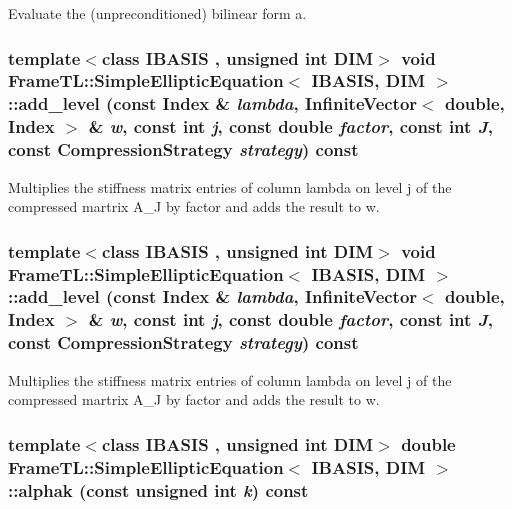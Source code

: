 Evaluate the (unpreconditioned) bilinear form a. \hypertarget{classFrameTL_1_1SimpleEllipticEquation_c21526eb37390ef77b7130e20c6ae000}{
\subsubsection[{add\_\-level}]{\setlength{\rightskip}{0pt plus 5cm}template$<$class IBASIS , unsigned int DIM$>$ void {\bf FrameTL::SimpleEllipticEquation}$<$ IBASIS, DIM $>$::add\_\-level (const {\bf Index} \& {\em lambda}, \/  InfiniteVector$<$ double, {\bf Index} $>$ \& {\em w}, \/  const int {\em j}, \/  const double {\em factor}, \/  const int {\em J}, \/  const CompressionStrategy {\em strategy}) const}}
\label{classFrameTL_1_1SimpleEllipticEquation_c21526eb37390ef77b7130e20c6ae000}


Multiplies the stiffness matrix entries of column lambda on level j of the compressed martrix A\_\-J by factor and adds the result to w. \hypertarget{classFrameTL_1_1SimpleEllipticEquation_c21526eb37390ef77b7130e20c6ae000}{
\subsubsection[{add\_\-level}]{\setlength{\rightskip}{0pt plus 5cm}template$<$class IBASIS , unsigned int DIM$>$ void {\bf FrameTL::SimpleEllipticEquation}$<$ IBASIS, DIM $>$::add\_\-level (const {\bf Index} \& {\em lambda}, \/  InfiniteVector$<$ double, {\bf Index} $>$ \& {\em w}, \/  const int {\em j}, \/  const double {\em factor}, \/  const int {\em J}, \/  const CompressionStrategy {\em strategy}) const}}
\label{classFrameTL_1_1SimpleEllipticEquation_c21526eb37390ef77b7130e20c6ae000}


Multiplies the stiffness matrix entries of column lambda on level j of the compressed martrix A\_\-J by factor and adds the result to w. \hypertarget{classFrameTL_1_1SimpleEllipticEquation_aa99066841e723261103f2e7354eff92}{
\subsubsection[{alphak}]{\setlength{\rightskip}{0pt plus 5cm}template$<$class IBASIS , unsigned int DIM$>$ double {\bf FrameTL::SimpleEllipticEquation}$<$ IBASIS, DIM $>$::alphak (const unsigned int {\em k}) const}}
\label{classFrameTL_1_1SimpleEllipticEquation_aa99066841e723261103f2e7354eff92}


